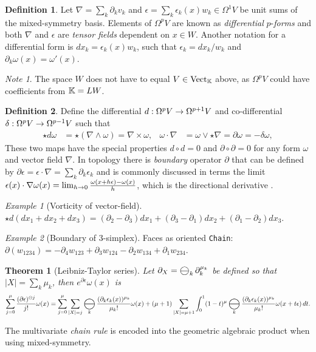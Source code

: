 \documentclass[]{article}
\newtheorem{theorem}{Theorem}
\theoremstyle{definition}
\newtheorem{definition}{Definition}
\theoremstyle{remark}
\newtheorem{example}{Example}
\newtheorem*{note}{Note}
\DeclareMathOperator*{\bigominus}{\scalerel*{\ominus}{\bigodot}}
\begin{document}
\begin{definition}
	Let $\nabla = \sum_k\partial_kv_k$ and $\epsilon = \sum_k\epsilon_k(x)w_k \in \Omega^1V$ be unit sums of the mixed-symmetry basis.
	Elements of $\Omega^pV$ are known as \textit{differential} $p$-\textit{forms} and both $\nabla$ and $\epsilon$ are \textit{tensor fields} dependent on $x\in W$.
	Another notation for a differential form is $dx_k = \epsilon_k(x)w_k$, such that $\epsilon_k = dx_k/w_k$ and $\partial_k\omega(x) = \omega'(x)$.
\end{definition}
\begin{note}
	The space $W$ does not have to equal $V\in\text{Vect}_{\mathbb{K}}$ above, as $\Omega^pV$ could have coefficients from $\mathbb{K} = LW$.
\end{note}
\begin{definition}
	Define \cite{bishop-goldberg} the differential $d:\Omega^p V\rightarrow\Omega^{p+1}V$ and co-differential $\delta:\Omega^pV\rightarrow\Omega^{p-1}V$ such that
	\begin{align*}
		\star d\omega &= \star(\nabla\wedge\omega) = \nabla\times\omega, & \omega\cdot\nabla &= \omega\vee\star\nabla = \partial\omega =-\delta\omega, 
	\end{align*}
	These two maps have the special properties $d\circ d=0$ and $\partial\circ\partial = 0$ for any form $\omega$ and vector field $\nabla$. 
	In topology there is \textit{boundary} operator $\partial$ that can be defined by $\partial\epsilon = \epsilon\cdot\nabla = \sum_k\partial_k\epsilon_k$ and is commonly discussed in terms the limit $\epsilon(x)\cdot\nabla\omega(x) = \lim_{h\rightarrow0} \frac{\omega(x+h\epsilon)-\omega(x)}{h}$, which is the directional derivative \cite{sobczyk}.
\end{definition}
\begin{example}
	[Vorticity of vector-field]
	$\star d(dx_1+dx_2+dx_3) = (∂_2 -∂_3)dx_1 + (∂_3 -∂_1)dx_2 + (∂_1 -∂_2)dx_3$.
\end{example}
\begin{example}
	[Boundary of 3-simplex]
	Faces as oriented \verb`Chain`: $\partial(w_{1234}) = -\partial_4w_{123}+\partial_3w_{124}-\partial_2w_{134}+\partial_1w_{234}$.
\end{example}
\begin{theorem}[Leibniz-Taylor series]
	Let $\partial_X=\bigominus_k\partial_k^{\mu_k}$ be defined so that $|X|=\sum_k\mu_k$, then $e^{\partial\epsilon}\omega(x)$ is
	\begin{align*}
		\sum_{j=0}^\mu \frac{(\partial\epsilon)^{\ominus j}}{j!}\omega(x)
		= \sum_{j=0}^\mu\sum_{|X|=j} \bigominus_k \frac{(\partial_{k}\epsilon_k(x))^{\mu_{k}}}{\mu_k!}\omega(x)
		+ (\mu+1)\sum_{|X|=\mu+1}\int_0^1(1-t)^\mu\bigominus_k\frac{(\partial_k\epsilon_k(x))^{\mu_k}}{\mu_k!}\omega(x+t\epsilon)\,dt.
	\end{align*}
\end{theorem}
The multivariate \textit{chain rule} is encoded into the geometric algebraic product when using mixed-symmetry.
\end{document}
